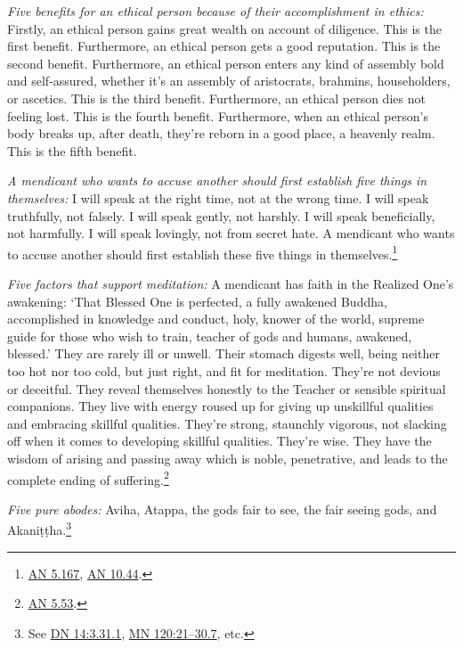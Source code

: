 \documentclass[12pt,openany]{book}%
\begin{document}
\emph{Five benefits for an ethical person because of their accomplishment in ethics:} Firstly, an ethical person gains great wealth on account of diligence. This is the first benefit. Furthermore, an ethical person gets a good reputation. This is the second benefit. Furthermore, an ethical person enters any kind of assembly bold and self-assured, whether it’s an assembly of aristocrats, brahmins, householders, or ascetics. This is the third benefit. Furthermore, an ethical person dies not feeling lost. This is the fourth benefit. Furthermore, when an ethical person’s body breaks up, after death, they’re reborn in a good place, a heavenly realm. This is the fifth benefit. 

\emph{A mendicant who wants to accuse another should first establish five things in themselves:} I will speak at the right time, not at the wrong time. I will speak truthfully, not falsely. I will speak gently, not harshly. I will speak beneficially, not harmfully. I will speak lovingly, not from secret hate. A mendicant who wants to accuse another should first establish these five things in themselves.\footnote{\href{https://suttacentral.net/an5.167/en/sujato}{AN 5.167}, \href{https://suttacentral.net/an10.44/en/sujato}{AN 10.44}. } 

\emph{Five factors that support meditation:} A mendicant has faith in the Realized One’s awakening: ‘That Blessed One is perfected, a fully awakened Buddha, accomplished in knowledge and conduct, holy, knower of the world, supreme guide for those who wish to train, teacher of gods and humans, awakened, blessed.’ They are rarely ill or unwell. Their stomach digests well, being neither too hot nor too cold, but just right, and fit for meditation. They’re not devious or deceitful. They reveal themselves honestly to the Teacher or sensible spiritual companions. They live with energy roused up for giving up unskillful qualities and embracing skillful qualities. They’re strong, staunchly vigorous, not slacking off when it comes to developing skillful qualities. They’re wise. They have the wisdom of arising and passing away which is noble, penetrative, and leads to the complete ending of suffering.\footnote{\href{https://suttacentral.net/an5.53/en/sujato}{AN 5.53}. } 

\emph{Five pure abodes:} Aviha, Atappa, the gods fair to see, the fair seeing gods, and \textsanskrit{Akaniṭṭha}.\footnote{See \href{https://suttacentral.net/dn14/en/sujato\#3.31.1}{DN 14:3.31.1}, \href{https://suttacentral.net/mn120/en/sujato\#21-30.7}{MN 120:21–30.7}, etc. } 
\end{document}
